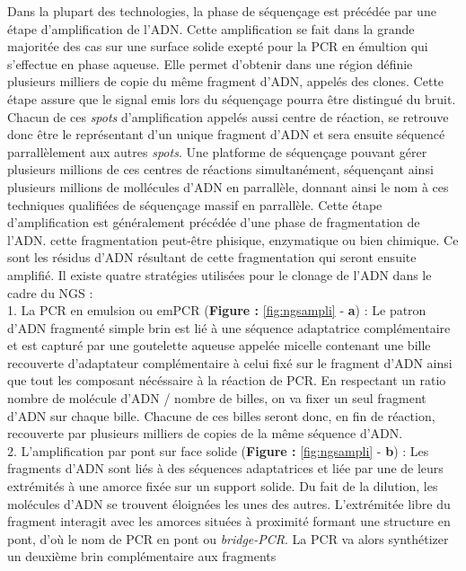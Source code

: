 \documentclass[12pt,twoside]{reedthesis}
\theoremstyle{definition}
\theoremstyle{definition}
\theoremstyle{remark}
\begin{document}
  Dans la plupart des technologies, la phase de séquençage est précédée
  par une étape d'amplification de l'ADN. Cette amplification se fait dans
  la grande majoritée des cas sur une surface solide exepté pour la PCR en
  émultion qui s'effectue en phase aqueuse. Elle permet d'obtenir dans une
  région définie plusieurs milliers de copie du même fragment d'ADN,
  appelés des clones. Cette étape assure que le signal emis lors du
  séquençage pourra être distingué du bruit. Chacun de ces \emph{spots}
  d'amplification appelés aussi centre de réaction, se retrouve donc être
  le représentant d'un unique fragment d'ADN et sera ensuite séquencé
  parrallèlement aux autres \emph{spots}. Une platforme de séquençage
  pouvant gérer plusieurs millions de ces centres de réactions
  simultanément, séquençant ainsi plusieurs millions de mollécules d'ADN
  en parrallèle, donnant ainsi le nom à ces techniques qualifiées de
  séquençage massif en parrallèle. Cette étape d'amplification est
  généralement précédée d'une phase de fragmentation de l'ADN. cette
  fragmentation peut-être phisique, enzymatique ou bien chimique. Ce sont
  les résidus d'ADN résultant de cette fragmentation qui seront ensuite
  amplifié. Il existe quatre stratégies utilisées pour le clonage de l'ADN
  dans le cadre du NGS :\\
  1. La PCR en emulsion ou emPCR (\textbf{Figure : }\ref{fig:ngsampli} -
  \textbf{a}) : Le patron d'ADN fragmenté simple brin est lié à une
  séquence adaptatrice complémentaire et est capturé par une goutelette
  aqueuse appelée micelle contenant une bille recouverte d'adaptateur
  complémentaire à celui fixé sur le fragment d'ADN ainsi que tout les
  composant nécéssaire à la réaction de PCR. En respectant un ratio nombre
  de molécule d'ADN / nombre de billes, on va fixer un seul fragment d'ADN
  sur chaque bille. Chacune de ces billes seront donc, en fin de réaction,
  recouverte par plusieurs milliers de copies de la même séquence d'ADN.\\
  2. L'amplification par pont sur face solide (\textbf{Figure :
  }\ref{fig:ngsampli} - \textbf{b}) : Les fragments d'ADN sont liés à des
  séquences adaptatrices et liée par une de leurs extrémités à une amorce
  fixée sur un support solide. Du fait de la dilution, les molécules d'ADN
  se trouvent éloignées les unes des autres. L'extrémitée libre du
  fragment interagit avec les amorces situées à proximité formant une
  structure en pont, d'où le nom de PCR en pont ou \emph{bridge-PCR}. La
  PCR va alors synthétizer un deuxième brin complémentaire aux fragments
\end{document}
